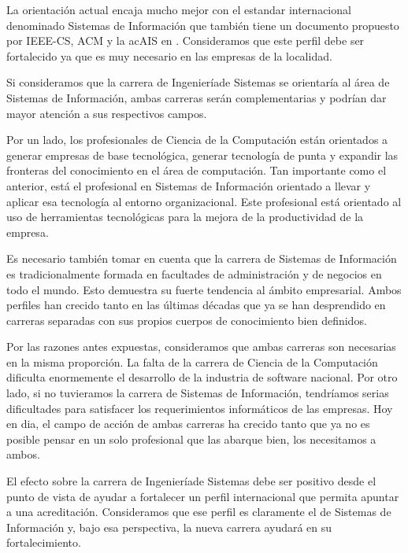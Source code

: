 La orientación actual encaja mucho mejor con el estandar
internacional denominado Sistemas de Información que también tiene
un documento propuesto por IEEE-CS, ACM y la ac{AIS} en
\cite{InformationSystems2002Journal}. Consideramos que este perfil debe ser
fortalecido ya que es muy necesario en las empresas de la localidad.

Si consideramos que la carrera de Ingenieríade Sistemas se
orientaría al área de Sistemas de Información, ambas carreras serán
complementarias y podrían dar mayor atención a sus respectivos
campos.

Por un lado, los profesionales de Ciencia de la Computación están orientados a generar empresas
de base tecnológica, generar tecnología de punta y expandir las
fronteras del conocimiento en el área de computación. Tan importante
como el anterior, está el profesional en Sistemas de Información
orientado a llevar y aplicar esa tecnología al entorno organizacional. Este profesional está orientado al uso de
herramientas tecnológicas para la mejora de la productividad de la empresa.

Es necesario también tomar en cuenta que la carrera de Sistemas de Información es tradicionalmente formada en facultades de administración y de negocios en todo el mundo. Esto demuestra su fuerte tendencia al ámbito empresarial. Ambos perfiles han crecido tanto en las últimas décadas que ya se han desprendido en carreras separadas con sus propios cuerpos de conocimiento bien definidos.

Por las razones antes expuestas, consideramos que ambas carreras son necesarias en la misma proporción. La falta de la carrera de Ciencia de la Computación dificulta enormemente el desarrollo de la industria de software nacional. Por otro lado, si no tuvieramos la carrera de Sistemas de Información, tendríamos serias dificultades para satisfacer los requerimientos informáticos de las empresas. Hoy en dia, el campo de acción de ambas carreras ha crecido tanto que ya no es posible pensar en un solo profesional que las abarque bien, los necesitamos a ambos.

El efecto sobre la carrera de Ingenieríade Sistemas debe ser positivo desde el punto de vista de ayudar a fortalecer un perfil internacional que permita apuntar a una acreditación. Consideramos que ese perfil es claramente el de Sistemas de Información y, bajo esa perspectiva, la nueva carrera ayudará en su fortalecimiento.